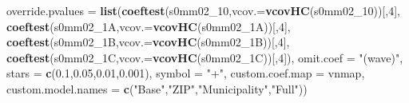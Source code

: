 \documentclass[
]{article}
\newenvironment{Shaded}{\begin{snugshade}}{\end{snugshade}}
\newcommand{\DataTypeTok}[1]{\textcolor[rgb]{0.13,0.29,0.53}{#1}}
\newcommand{\DecValTok}[1]{\textcolor[rgb]{0.00,0.00,0.81}{#1}}
\newcommand{\FloatTok}[1]{\textcolor[rgb]{0.00,0.00,0.81}{#1}}
\newcommand{\KeywordTok}[1]{\textcolor[rgb]{0.13,0.29,0.53}{\textbf{#1}}}
\newcommand{\NormalTok}[1]{#1}
\newcommand{\StringTok}[1]{\textcolor[rgb]{0.31,0.60,0.02}{#1}}
\begin{document}
\begin{Shaded}
\begin{Highlighting}[]
          \DataTypeTok{override.pvalues =} \KeywordTok{list}\NormalTok{(}\KeywordTok{coeftest}\NormalTok{(s0mm02_}\DecValTok{10}\NormalTok{,}\DataTypeTok{vcov.=}\KeywordTok{vcovHC}\NormalTok{(s0mm02_}\DecValTok{10}\NormalTok{))[,}\DecValTok{4}\NormalTok{],}
                                  \KeywordTok{coeftest}\NormalTok{(s0mm02_1A,}\DataTypeTok{vcov.=}\KeywordTok{vcovHC}\NormalTok{(s0mm02_1A))[,}\DecValTok{4}\NormalTok{],}
                                  \KeywordTok{coeftest}\NormalTok{(s0mm02_1B,}\DataTypeTok{vcov.=}\KeywordTok{vcovHC}\NormalTok{(s0mm02_1B))[,}\DecValTok{4}\NormalTok{],}
                                  \KeywordTok{coeftest}\NormalTok{(s0mm02_1C,}\DataTypeTok{vcov.=}\KeywordTok{vcovHC}\NormalTok{(s0mm02_1C))[,}\DecValTok{4}\NormalTok{]),}
          \DataTypeTok{omit.coef =} \StringTok{"(wave)"}\NormalTok{, }\DataTypeTok{stars =} \KeywordTok{c}\NormalTok{(}\FloatTok{0.1}\NormalTok{,}\FloatTok{0.05}\NormalTok{,}\FloatTok{0.01}\NormalTok{,}\FloatTok{0.001}\NormalTok{), }\DataTypeTok{symbol =} \StringTok{"+"}\NormalTok{,}
          \DataTypeTok{custom.coef.map =}\NormalTok{ vnmap, }
          \DataTypeTok{custom.model.names =} \KeywordTok{c}\NormalTok{(}\StringTok{"Base"}\NormalTok{,}\StringTok{"ZIP"}\NormalTok{,}\StringTok{"Municipality"}\NormalTok{,}\StringTok{"Full"}\NormalTok{))}
\end{Highlighting}
\end{Shaded}
\end{document}
